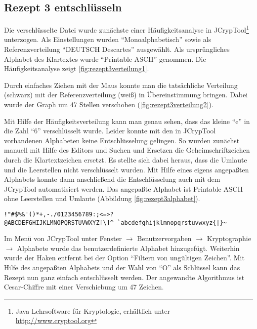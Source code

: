 \subsection{Rezept 3 entschlüsseln}
\label{RezeptDreiEntschluesseln}

Die verschlüsselte Datei wurde zunächste einer Häufigkeitsanalyse in
JCrypTool\footnote{Java Lehrsoftware für Kryptologie, erhältlich unter
  \url{http://www.cryptool.org}} unterzogen. Als Einstellungen wurden
``Monoalphabetisch'' sowie als Referenzverteilung ``DEUTSCH Descartes''
ausgewählt. Als ursprüngliches Alphabet des Klartextes wurde ``Printable ASCII''
genommen. Die Häufigkeitsanalyse zeigt \cref{fig:rezept3verteilung1}.


Durch einfaches Ziehen mit der Maus konnte man die tatsächliche Verteilung
(schwarz) mit der Referenzverteilung (weiß) in Übereinstimmung bringen. Dabei
wurde der Graph um 47 Stellen verschoben (\cref{fig:rezept3verteilung2}).


Mit Hilfe der Häufigkeitsverteilung kann man genau sehen, dass das kleine ``e''
in die Zahl ``6'' verschlüsselt wurde. Leider konnte mit den in JCrypTool
vorhandenen Alphabeten keine Entschlüsselung gelingen. So wurden zunächst
manuell mit Hilfe des Editors und Suchen und Ersetzen die Geheimschriftzeichen
durch die Klartextzeichen ersetzt. Es stellte sich dabei heraus, dass die
Umlaute und die Leerstellen nicht verschlüsselt wurden. Mit Hilfe eines eigens
angepaßten Alphabets konnte dann anschließend die Entschlüsselung auch mit dem
JCrypTool automatisiert werden. Das angepaßte Alphabet ist Printable ASCII ohne
Leerstellen und Umlaute (Abbildung \ref{fig:rezept3alphabet}).

\begin{lstlisting}[label=fig:rezept3alphabet]
!"#$%&'()*+,-./0123456789:;<=>?
@ABCDEFGHIJKLMNOPQRSTUVWXYZ[\]^_`abcdefghijklmnopqrstuvwxyz{|}~
\end{lstlisting}

Im Menü von JCrypTool unter Fenster $\rightarrow$ Benutzervorgaben $\rightarrow$
Kryptographie $\rightarrow$ Alphabete wurde das benutzerdefinierte Alphabet
hinzugefügt. Weiterhin wurde der Haken entfernt bei der Option ``Filtern von
ungültigen Zeichen''.  Mit Hilfe des angepaßten Alphabets und der Wahl von ``O''
als Schlüssel kann das Rezept nun ganz einfach entschlüsselt werden.  Der
angewandte Algorithmus ist Cesar-Chiffre mit einer Verschiebung um 47 Zeichen.
